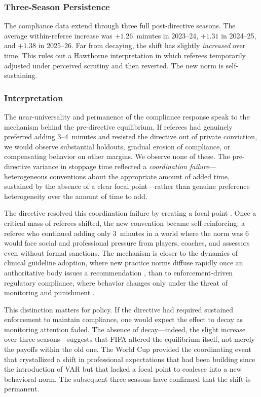 \subsubsection*{Three-Season Persistence}

The compliance data extend through three full post-directive seasons.
The average within-referee increase was $+1.26$~minutes in 2023--24,
$+1.31$ in 2024--25, and $+1.38$ in 2025--26. Far from decaying, the
shift has slightly \textit{increased} over time. This rules out a
Hawthorne interpretation in which referees temporarily adjusted under
perceived scrutiny and then reverted. The new norm is self-sustaining.

\subsubsection*{Interpretation}

The near-universality and permanence of the compliance response speak
to the mechanism behind the pre-directive equilibrium. If referees had
genuinely preferred adding 3--4~minutes and resisted the directive out
of private conviction, we would observe substantial holdouts, gradual
erosion of compliance, or compensating behavior on other margins. We
observe none of these. The pre-directive variance in stoppage time
reflected a \textit{coordination failure}---heterogeneous conventions
about the appropriate amount of added time, sustained by the absence
of a clear focal point---rather than genuine preference heterogeneity
over the amount of time to add.

The directive resolved this coordination failure by creating a focal
point \citep{rothockenfels2002}. Once a critical mass of referees
shifted, the new convention became self-reinforcing: a referee who
continued adding only 3~minutes in a world where the norm was 6 would
face social and professional pressure from players, coaches, and
assessors even without formal sanctions. The mechanism is closer to
the dynamics of clinical guideline adoption, where new practice norms
diffuse rapidly once an authoritative body issues a recommendation
\citep{cabana1999compliance}, than to enforcement-driven regulatory
compliance, where behavior changes only under the threat of monitoring
and punishment \citep{duflo2013truth, johnson2020compliance}.

This distinction matters for policy. If the directive had required
sustained enforcement to maintain compliance, one would expect the
effect to decay as monitoring attention faded. The absence of
decay---indeed, the slight increase over three seasons---suggests that
FIFA altered the equilibrium itself, not merely the payoffs within the
old one. The World Cup provided the coordinating event that crystallized
a shift in professional expectations that had been building since the
introduction of VAR but that lacked a focal point to coalesce into a
new behavioral norm. The subsequent three seasons have confirmed that
the shift is permanent.
